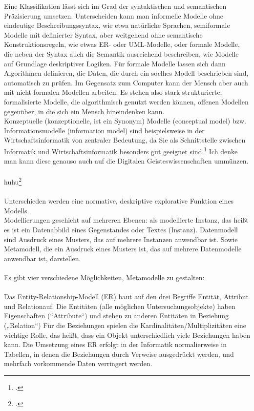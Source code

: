 \documentclass[12pt,a4paper]{article}
\begin{document}
Eine Klassifikation lässt sich im Grad der syntaktischen und semantischen Präzisierung umsetzen. Unterscheiden kann man informelle Modelle ohne eindeutige Beschreibungssyntax, wie etwa natürliche Sprachen, semiformale Modelle mit definierter Syntax, aber weitgehend ohne semantische Konstruktionsregeln, wie etwas ER- oder UML-Modelle, oder formale Modelle, die neben der Syntax auch die Semantik ausreichend beschreiben, wie Modelle auf Grundlage deskriptiver Logiken. Für formale Modelle lassen sich dann Algorithmen definieren, die Daten, die durch ein soclhes Modell beschrieben sind, automatisch zu prüfen. Im Gegensatz zum Computer kann der Mensch aber auch mit nicht formalen Modellen arbeiten. Es stehen also stark strukturierte, formalisierte Modelle, die algorithmisch genutzt werden können, offenen Modellen gegenüber, in die sich ein Mensch hineindenken kann.
\\
Konzeptuelle (konzeptionelle, ist ein Synonym) Modelle (conceptual model) bzw. Informationsmodelle (information model) sind beispielsweise in der Wirtschaftsinformatik von zentraler Bedeutung, da Sie als Schnittstelle zwischen Informatik und Wirtschaftsinformatik besonders gut geeignet sind.\footcite[][S.44-47]{kobler2010qualitat} Ich denke man kann diese genauso auch auf die Digitalen Geisteswissenschaften ummünzen.
\\
\\
huhu\footcite[Vgl][S.99-108]{jannidis2017digital} 
\\
\\
Unterschieden werden eine normative, deskriptive  explorative Funktion eines Modells.
\\
Modellierungen geschieht auf mehreren Ebenen: als modellierte Instanz, das heißt es ist ein Datenabbild eines Gegenstandes oder Textes (Instanz). Datenmodell sind Ausdruck eines Musters, das auf mehrere Instanzen anwendbar ist. Sowie Metamodell, die ein Ausdruck eines Musters ist, das auf mehrere Datenmodelle anwendbar ist, darstellen.
\\
\\
Es gibt vier verschiedene Möglichkeiten, Metamodelle zu gestalten:
\\
\\
Das Entity-Relationship-Modell (ER) baut auf den drei Begriffe Entität, Attribut und Relationauf. Die Entitäten (alle möglichen Untersuchungsobjekte) haben Eigenschaften (“Attribute“) und stehen zu anderen Entitäten in Beziehung („Relation“) Für die Beziehungen spielen die Kardinalitäten/Multiplizitäten eine wichtige Rolle, das heißt, dass ein Objekt unterschiedlich viele Beziehungen haben kann. Die Umsetzung eines ER erfolgt in der Informatik normalierweise in Tabellen, in denen die Beziehungen durch Verweise ausgedrückt werden, und mehrfach vorkommende Daten verringert werden.
\end{document}
